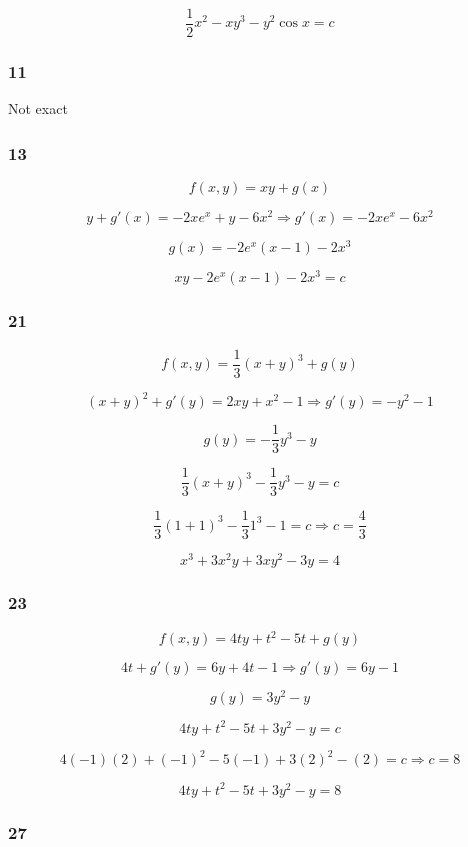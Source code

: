 \documentclass{article}
\begin{document}
\[\frac{1}{2} x^2 - x y^3 - y^2 \cos x = c\]

\subsubsection{11}

Not exact

\subsubsection{13}

\[f(x, y) = x y + g(x)\]

\[y + g'(x) = -2 x e^x + y - 6 x^2 \Rightarrow g'(x) = -2 x e^x - 6 x^2\]

\[g(x) = -2 e^x (x - 1) - 2 x^3\]

\[x y - 2 e^x (x - 1) - 2 x^3 = c\]

\subsubsection{21}

\[f(x, y) = \frac{1}{3} (x + y)^3 + g(y)\]

\[(x + y)^2 + g'(y) = 2 x y + x^2 - 1 \Rightarrow g'(y) = -y^2 - 1\]

\[g(y) = -\frac{1}{3} y^3 - y\]

\[\frac{1}{3} (x + y)^3 - \frac{1}{3} y^3 - y = c\]

\[\frac{1}{3} (1 + 1)^3 - \frac{1}{3} 1^3 - 1 = c \Rightarrow c = \frac{4}{3}\]

\[x^3 + 3 x^2 y + 3 x y^2 - 3 y = 4\]

\subsubsection{23}

\[f(x, y) = 4 t y + t^2 - 5 t + g(y)\]

\[4 t + g'(y) = 6 y + 4 t - 1 \Rightarrow g'(y) = 6 y - 1\]

\[g(y) = 3 y^2 - y\]

\[4 t y + t^2 - 5 t + 3 y^2 - y = c\]

\[4 (-1) (2) + (-1)^2 - 5 (-1) + 3 (2)^2 - (2) = c \Rightarrow c = 8\]

\[4 t y + t^2 - 5 t + 3 y^2 - y = 8\]

\subsubsection{27}
\end{document}
